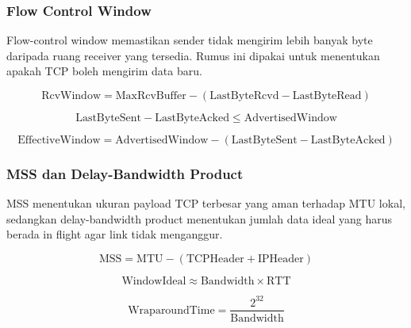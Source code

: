 \subsubsection{Flow Control Window}
\begin{jawab}
Flow-control window memastikan sender tidak mengirim lebih banyak byte daripada ruang receiver yang tersedia. Rumus ini dipakai untuk menentukan apakah TCP boleh mengirim data baru.
\end{jawab}

\begin{equation}
    \text{RcvWindow} =
    \text{MaxRcvBuffer} - (\text{LastByteRcvd}-\text{LastByteRead})
    \label{eq:rcv-window}
\end{equation}

\begin{equation}
    \text{LastByteSent} - \text{LastByteAcked} \leq \text{AdvertisedWindow}
    \label{eq:sender-flow-bound}
\end{equation}

\begin{equation}
    \text{EffectiveWindow} =
    \text{AdvertisedWindow} - (\text{LastByteSent}-\text{LastByteAcked})
    \label{eq:effective-window}
\end{equation}

\subsubsection{MSS dan Delay-Bandwidth Product}
\begin{jawab}
MSS menentukan ukuran payload TCP terbesar yang aman terhadap MTU lokal, sedangkan delay-bandwidth product menentukan jumlah data ideal yang harus berada in flight agar link tidak menganggur.
\end{jawab}

\begin{equation}
    \text{MSS} = \text{MTU} - (\text{TCPHeader}+\text{IPHeader})
    \label{eq:mss}
\end{equation}

\begin{equation}
    \text{WindowIdeal} \approx \text{Bandwidth} \times \text{RTT}
    \label{eq:bdp}
\end{equation}

\begin{equation}
    \text{WraparoundTime} = \frac{2^{32}}{\text{Bandwidth}}
    \label{eq:wraparound}
\end{equation}

